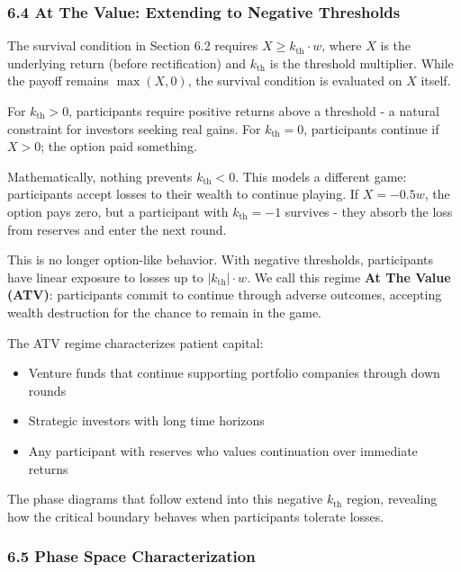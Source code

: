 \documentclass[
  11pt,
  openany]{article}
\providecommand{\tightlist}{%
  \setlength{\itemsep}{0pt}\setlength{\parskip}{0pt}}
\providecommand{\tightlist}{%
  \setlength{\itemsep}{0pt}\setlength{\parskip}{0pt}}
\begin{document}
\subsubsection{6.4 At The Value: Extending to Negative
Thresholds}\label{at-the-value-extending-to-negative-thresholds}

The survival condition in Section 6.2 requires
\(X \geq k_{\text{th}} \cdot w\), where \(X\) is the underlying return
(before rectification) and \(k_{\text{th}}\) is the threshold
multiplier. While the payoff remains \(\max(X, 0)\), the survival
condition is evaluated on \(X\) itself.

For \(k_{\text{th}} > 0\), participants require positive returns above a
threshold - a natural constraint for investors seeking real gains. For
\(k_{\text{th}} = 0\), participants continue if \(X > 0\); the option
paid something.

Mathematically, nothing prevents \(k_{\text{th}} < 0\). This models a
different game: participants accept losses to their wealth to continue
playing. If \(X = -0.5w\), the option pays zero, but a participant with
\(k_{\text{th}} = -1\) survives - they absorb the loss from reserves and
enter the next round.

This is no longer option-like behavior. With negative thresholds,
participants have linear exposure to losses up to
\(|k_{\text{th}}| \cdot w\). We call this regime \textbf{At The Value
(ATV)}: participants commit to continue through adverse outcomes,
accepting wealth destruction for the chance to remain in the game.

The ATV regime characterizes patient capital:

\begin{itemize}
\tightlist
\item
  Venture funds that continue supporting portfolio companies through
  down rounds
\item
  Strategic investors with long time horizons
\item
  Any participant with reserves who values continuation over immediate
  returns
\end{itemize}

The phase diagrams that follow extend into this negative
\(k_{\text{th}}\) region, revealing how the critical boundary behaves
when participants tolerate losses.

\subsubsection{6.5 Phase Space
Characterization}\label{phase-space-characterization}
\end{document}
